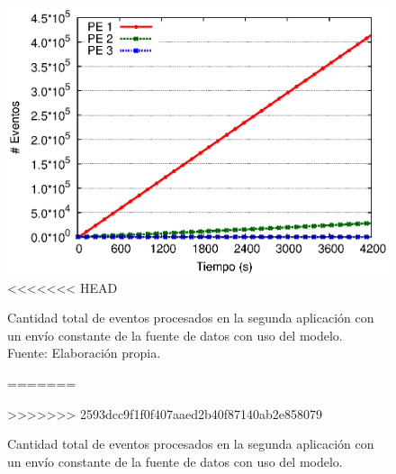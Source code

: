 \begin{figure}[!ht]
	\centering
	\captionsetup{justification=centering}
    \includegraphics[scale=0.7]{images/exp/app2/uniform/sm/eventCount.eps}
<<<<<<< HEAD
    \caption[Cantidad total de eventos procesados en la segunda aplicación con un envío constante de la fuente de datos con uso del modelo.]{Cantidad total de eventos procesados en la segunda aplicación con un envío constante de la fuente de datos con uso del modelo.\\Fuente: Elaboración propia.}
=======
    \caption{Cantidad total de eventos procesados en la segunda aplicaci\'on con un env\'io constante de la fuente de datos con uso del modelo.}
>>>>>>> 2593dcc9f1f0f407aaed2b40f87140ab2e858079
    \label{fig:app2-uniform-eventCount-sm}
\end{figure}


